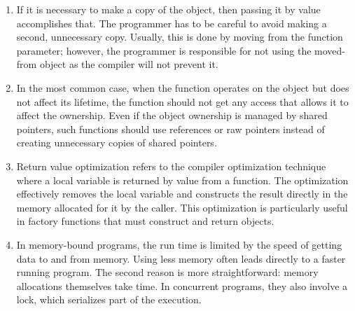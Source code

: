 \begin{enumerate}
\item 
If it is necessary to make a copy of the object, then passing it by value accomplishes that. The programmer has to be careful to avoid making a second, unnecessary copy. Usually, this is done by moving from the function parameter; however, the programmer is responsible for not using the moved-from object as the compiler will not prevent it.

\item 
In the most common case, when the function operates on the object but does not affect its lifetime, the function should not get any access that allows it to affect the ownership. Even if the object ownership is managed by shared pointers, such functions should use references or raw pointers instead of creating unnecessary copies of shared pointers.

\item 
Return value optimization refers to the compiler optimization technique where a local variable is returned by value from a function. The optimization effectively removes the local variable and constructs the result directly in the memory allocated for it by the caller. This optimization is particularly useful in factory functions that must construct and return objects.

\item
In memory-bound programs, the run time is limited by the speed of getting data to and from memory. Using less memory often leads directly to a faster running program. The second reason is more straightforward: memory allocations themselves take time. In concurrent programs, they also involve a lock, which serializes part of the execution.

\end{enumerate}